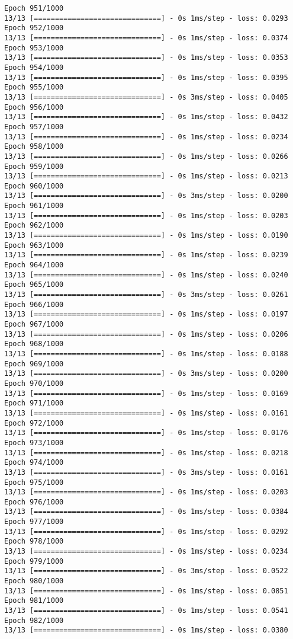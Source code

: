 \documentclass[11pt]{article}
\begin{document}
\begin{Verbatim}[commandchars=\\\{\}]
Epoch 951/1000
13/13 [==============================] - 0s 1ms/step - loss: 0.0293
Epoch 952/1000
13/13 [==============================] - 0s 1ms/step - loss: 0.0374
Epoch 953/1000
13/13 [==============================] - 0s 1ms/step - loss: 0.0353
Epoch 954/1000
13/13 [==============================] - 0s 1ms/step - loss: 0.0395
Epoch 955/1000
13/13 [==============================] - 0s 3ms/step - loss: 0.0405
Epoch 956/1000
13/13 [==============================] - 0s 1ms/step - loss: 0.0432
Epoch 957/1000
13/13 [==============================] - 0s 1ms/step - loss: 0.0234
Epoch 958/1000
13/13 [==============================] - 0s 1ms/step - loss: 0.0266
Epoch 959/1000
13/13 [==============================] - 0s 1ms/step - loss: 0.0213
Epoch 960/1000
13/13 [==============================] - 0s 3ms/step - loss: 0.0200
Epoch 961/1000
13/13 [==============================] - 0s 1ms/step - loss: 0.0203
Epoch 962/1000
13/13 [==============================] - 0s 1ms/step - loss: 0.0190
Epoch 963/1000
13/13 [==============================] - 0s 1ms/step - loss: 0.0239
Epoch 964/1000
13/13 [==============================] - 0s 1ms/step - loss: 0.0240
Epoch 965/1000
13/13 [==============================] - 0s 3ms/step - loss: 0.0261
Epoch 966/1000
13/13 [==============================] - 0s 1ms/step - loss: 0.0197
Epoch 967/1000
13/13 [==============================] - 0s 1ms/step - loss: 0.0206
Epoch 968/1000
13/13 [==============================] - 0s 1ms/step - loss: 0.0188
Epoch 969/1000
13/13 [==============================] - 0s 3ms/step - loss: 0.0200
Epoch 970/1000
13/13 [==============================] - 0s 1ms/step - loss: 0.0169
Epoch 971/1000
13/13 [==============================] - 0s 1ms/step - loss: 0.0161
Epoch 972/1000
13/13 [==============================] - 0s 1ms/step - loss: 0.0176
Epoch 973/1000
13/13 [==============================] - 0s 1ms/step - loss: 0.0218
Epoch 974/1000
13/13 [==============================] - 0s 3ms/step - loss: 0.0161
Epoch 975/1000
13/13 [==============================] - 0s 1ms/step - loss: 0.0203
Epoch 976/1000
13/13 [==============================] - 0s 1ms/step - loss: 0.0384
Epoch 977/1000
13/13 [==============================] - 0s 1ms/step - loss: 0.0292
Epoch 978/1000
13/13 [==============================] - 0s 1ms/step - loss: 0.0234
Epoch 979/1000
13/13 [==============================] - 0s 3ms/step - loss: 0.0522
Epoch 980/1000
13/13 [==============================] - 0s 1ms/step - loss: 0.0851
Epoch 981/1000
13/13 [==============================] - 0s 1ms/step - loss: 0.0541
Epoch 982/1000
13/13 [==============================] - 0s 1ms/step - loss: 0.0380

\end{Verbatim}
\end{document}
